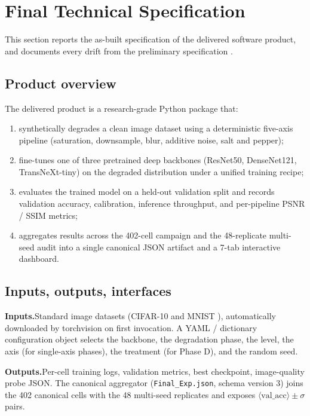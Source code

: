\section{Final Technical Specification}
\label{sec:spec}

This section reports the as-built specification of the delivered software
product, and documents every drift from the preliminary specification
\cite{shi2024transnext, huang2017densenet}.

\subsection{Product overview}
The delivered product is a research-grade Python package that:
\begin{enumerate}
  \item synthetically degrades a clean image dataset using a deterministic
        five-axis pipeline (saturation, downsample, blur, additive noise,
        salt and pepper);
  \item fine-tunes one of three pretrained deep backbones (ResNet50,
        DenseNet121, TransNeXt-tiny) on the degraded distribution under a
        unified training recipe;
  \item evaluates the trained model on a held-out validation split and
        records validation accuracy, calibration, inference throughput, and
        per-pipeline PSNR / SSIM metrics;
  \item aggregates results across the 402-cell campaign and the 48-replicate
        multi-seed audit into a single canonical JSON artifact and a 7-tab
        interactive dashboard.
\end{enumerate}

\subsection{Inputs, outputs, interfaces}
\textbf{Inputs.}\quad Standard image datasets (CIFAR-10 \cite{krizhevsky2009cifar10}
and MNIST \cite{lecun1998mnist}), automatically downloaded by torchvision on
first invocation. A YAML / dictionary configuration object selects the
backbone, the degradation phase, the level, the axis (for single-axis
phases), the treatment (for Phase D), and the random seed.

\textbf{Outputs.}\quad Per-cell training logs, validation metrics, best
checkpoint, image-quality probe JSON. The canonical aggregator
(\texttt{Final\_Exp.json}, schema version 3) joins the 402 canonical cells
with the 48 multi-seed replicates and exposes
$\langle\mathrm{val\_acc}\rangle \pm \sigma$ pairs.

